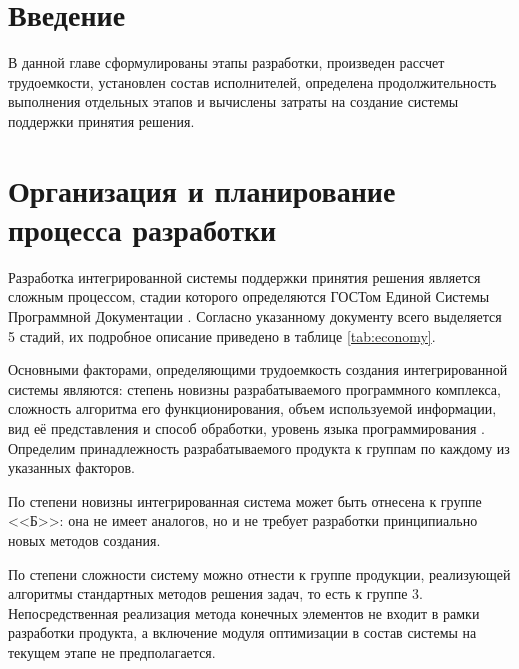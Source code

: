 \documentclass[14pt,oneside,final]{extreport}
\begin{document}
	\section{Введение}
	В данной главе сформулированы этапы разработки, произведен рассчет трудоемкости, установлен состав исполнителей, определена продолжительность выполнения отдельных этапов и вычислены затраты на создание системы поддержки принятия решения.	
	
	\section{Организация и планирование процесса разработки}
	Разработка интегрированной системы поддержки принятия решения является сложным процессом, стадии которого определяются ГОСТом Единой Системы Программной Документации \cite{gost:19102}. Согласно указанному документу всего выделяется 5 стадий, их подробное описание приведено в таблице \ref{tab:economy}.
	
	Основными факторами, определяющими трудоемкость создания интегрированной системы являются: степень новизны разрабатываемого программного комплекса, сложность алгоритма его функционирования, объем используемой информации, вид её представления и способ обработки, уровень языка программирования \cite{metoda:Economy}. Определим принадлежность разрабатываемого продукта к группам по каждому из указанных факторов. 
	
	По степени новизны интегрированная система может быть отнесена к группе <<Б>>: она не имеет аналогов, но и не требует разработки принципиально новых методов создания. 
	
	По степени сложности систему можно отнести к группе продукции, реализующей алгоритмы стандартных методов 
	решения задач, то есть к группе 3. Непосредственная реализация метода конечных элементов не входит в рамки разработки продукта, а включение модуля оптимизации в состав системы  на текущем этапе не предполагается.  \newpage
\end{document}
